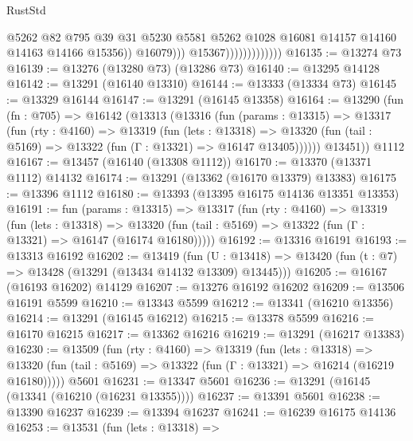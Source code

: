\begin{lexlean}{RustStd}
\begin{coremodule}
                                        @5262
                                        @82
                                        @795
                                        @39
                                        @31
                                        @5230
                                        @5581
                                        @5262
                                        @1028
                                        @16081
                                        @14157
                                        @14160
                                        @14163
                                        @14166
                                        @15356))
                                    @16079)))
                              @15367)))))))))))))
@16135 := @13274 @73
@16139 := @13276 (@13280 @73) (@13286 @73)
@16140 := @13295 @14128
@16142 := @13291 (@16140 @13310)
@16144 := @13333 (@13334 @73)
@16145 := @13329 @16144
@16147 := @13291 (@16145 @13358)
@16164 := @13290
    (fun (fn : @705) =>
    @16142
      (@13313
        (@13316
          (fun (params : @13315) =>
          @13317
            (fun (rty : @4160) =>
            @13319
              (fun (lets : @13318) =>
              @13320 (fun (tail : @5169) => @13322 (fun (Γ : @13321) => @16147 @13405))))))
        @13451))
    @1112
@16167 := @13457 (@16140 (@13308 @1112))
@16170 := @13370 (@13371 @1112) @14132
@16174 := @13291 (@13362 (@16170 @13379) @13383)
@16175 := @13396 @1112
@16180 := @13393 (@13395 @16175 @14136 @13351 @13353)
@16191 := fun (params : @13315) =>
  @13317
    (fun (rty : @4160) =>
    @13319
      (fun (lets : @13318) =>
      @13320 (fun (tail : @5169) => @13322 (fun (Γ : @13321) => @16147 (@16174 @16180)))))
@16192 := @13316 @16191
@16193 := @13313 @16192
@16202 := @13419
    (fun (U : @13418) => @13420 (fun (t : @7) => @13428 (@13291 (@13434 @14132 @13309) @13445)))
@16205 := @16167 (@16193 @16202) @14129
@16207 := @13276 @16192 @16202
@16209 := @13506 @16191 @5599
@16210 := @13343 @5599
@16212 := @13341 (@16210 @13356)
@16214 := @13291 (@16145 @16212)
@16215 := @13378 @5599
@16216 := @16170 @16215
@16217 := @13362 @16216
@16219 := @13291 (@16217 @13383)
@16230 := @13509
    (fun (rty : @4160) =>
    @13319
      (fun (lets : @13318) =>
      @13320 (fun (tail : @5169) => @13322 (fun (Γ : @13321) => @16214 (@16219 @16180)))))
    @5601
@16231 := @13347 @5601
@16236 := @13291 (@16145 (@13341 (@16210 (@16231 @13355))))
@16237 := @13391 @5601
@16238 := @13390 @16237
@16239 := @13394 @16237
@16241 := @16239 @16175 @14136
@16253 := @13531
    (fun (lets : @13318) =>

\end{coremodule}
\end{lexlean}
